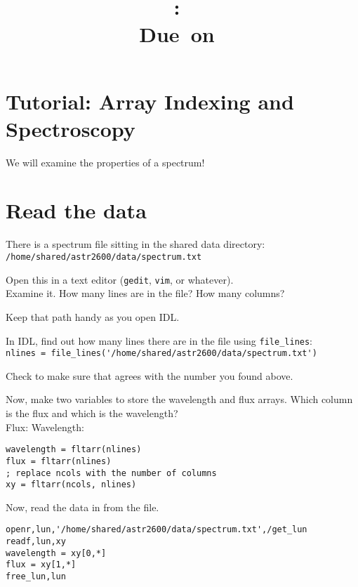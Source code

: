 \documentclass{article}
\title{\vspace{2in}\textmd{\textbf{\hmwkClass:\ \hmwkTitle}}\\\normalsize\vspace{0.1in}\small{Due\ on\ \hmwkDueDate}\\\vspace{0.1in}\large{}\vspace{3in}}
\date{}
\begin{document}
\begin{spacing}{1.0}
\newpage



\section{Tutorial: Array Indexing and Spectroscopy}

We will examine the properties of a spectrum!

\section{Read the data}
There is a spectrum file sitting in the shared data directory:
\verb|/home/shared/astr2600/data/spectrum.txt|

Open this in a text editor (\verb|gedit|, \verb|vim|, or whatever).\\
Examine it.  How many lines are in the file?  \underline{\hspace{3cm}}
How many columns? \underline{\hspace{3cm}}

Keep that path handy as you open IDL.

In IDL, find out how many lines there are in the file using \verb|file_lines|:\\
\verb|nlines = file_lines('/home/shared/astr2600/data/spectrum.txt')|

Check to make sure that agrees with the number you found above.

Now, make two variables to store the wavelength and flux arrays.
Which column is the flux and which is the wavelength? \\
Flux: \underline{\hspace{3cm}}
Wavelength: \underline{\hspace{3cm}}
\begin{verbatim}
wavelength = fltarr(nlines)
flux = fltarr(nlines)
; replace ncols with the number of columns
xy = fltarr(ncols, nlines)
\end{verbatim}

Now, read the data in from the file.  
\begin{lstlisting}
openr,lun,'/home/shared/astr2600/data/spectrum.txt',/get_lun
readf,lun,xy
wavelength = xy[0,*]
flux = xy[1,*]
free_lun,lun
\end{lstlisting}


\end{spacing}
\end{document}
